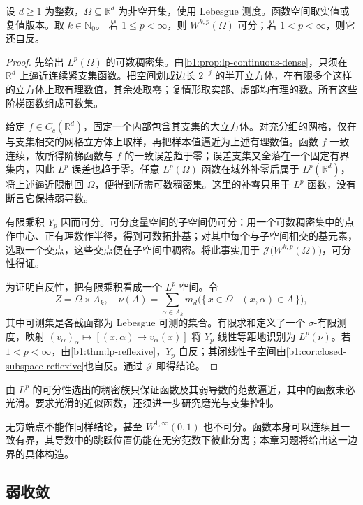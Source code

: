 \begin{proposition}\label{b1:prop:sobolev-separable-reflexive}
设 \(d\geq1\) 为整数，\(\Omega\subseteq\mathbb R^d\) 为非空开集，使用 Lebesgue 测度。函数空间取实值或复值版本。取 \(k\in\mathbb N_0\)。
若 \(1\leq p<\infty\)，则 \(W^{k,p}(\Omega)\) 可分；若 \(1<p<\infty\)，则它还自反。
\end{proposition}
\begin{proof}
先给出 \(L^p(\Omega)\) 的可数稠密集。由\cref{b1:prop:lp-continuous-dense}，只须在 \(\mathbb R^d\) 上逼近连续紧支集函数。把空间划成边长 \(2^{-j}\) 的半开立方体，在有限多个这样的立方体上取有理数值，其余处取零；复情形取实部、虚部均有理的数。所有这些阶梯函数组成可数集。

给定 \(f\in C_c(\mathbb R^d)\)，固定一个内部包含其支集的大立方体。对充分细的网格，仅在与支集相交的网格立方体上取样，再把样本值逼近为上述有理数值。函数 \(f\) 一致连续，故所得阶梯函数与 \(f\) 的一致误差趋于零；误差支集又全落在一个固定有界集内，因此 \(L^p\) 误差也趋于零。任意 \(L^p(\Omega)\) 函数在域外补零后属于 \(L^p(\mathbb R^d)\)，将上述逼近限制回 \(\Omega\)，便得到所需可数稠密集。这里的补零只用于 \(L^p\) 函数，没有断言它保持弱导数。

有限乘积 \(Y_p\) 因而可分。可分度量空间的子空间仍可分：用一个可数稠密集中的点作中心、正有理数作半径，得到可数拓扑基；对其中每个与子空间相交的基元素，选取一个交点，这些交点便在子空间中稠密。将此事实用于 \(\mathcal J\bigl(W^{k,p}(\Omega)\bigr)\)，可分性得证。

为证明自反性，把有限乘积看成一个 \(L^p\) 空间。令
\[
 Z=\Omega\times A_k,
 \quad \nu(A)=\sum_{\alpha\in A_k}
       m_d\bigl(\{\,x\in\Omega\mid(x,\alpha)\in A\,\}\bigr),
\]
其中可测集是各截面都为 Lebesgue 可测的集合。有限求和定义了一个 \(\sigma\)-有限测度，映射 \((v_\alpha)_\alpha\mapsto[(x,\alpha)\mapsto v_\alpha(x)]\) 将 \(Y_p\) 线性等距地识别为 \(L^p(\nu)\)。若 \(1<p<\infty\)，由\cref{b1:thm:lp-reflexive}，\(Y_p\) 自反；其闭线性子空间由\cref{b1:cor:closed-subspace-reflexive}也自反。通过 \(\mathcal J\) 即得结论。
\end{proof}

由 \(L^p\) 的可分性选出的稠密族只保证函数及其弱导数的范数逼近，其中的函数未必光滑。要求光滑的近似函数，还须进一步研究磨光与支集控制。

\ProseParagraphBreak

无穷端点不能作同样结论，甚至 \(W^{1,\infty}(0,1)\) 也不可分。函数本身可以连续且一致有界，其导数中的跳跃位置仍能在无穷范数下彼此分离；本章习题将给出这一边界的具体构造。

\subsection{弱收敛}
\label{b1:subsec:210204}

